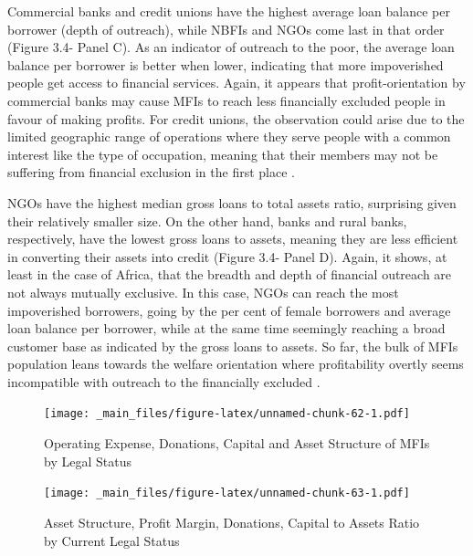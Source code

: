 \documentclass[a4paper, nobind]{templates/ociamthesis}
\begin{document}
Commercial banks and credit unions have the highest average loan balance per borrower (depth of outreach), while NBFIs and NGOs come last in that order (Figure 3.4- Panel C). As an indicator of outreach to the poor, the average loan balance per borrower is better when lower, indicating that more impoverished people get access to financial services. Again, it appears that profit-orientation by commercial banks may cause MFIs to reach less financially excluded people in favour of making profits. For credit unions, the observation could arise due to the limited geographic range of operations where they serve people with a common interest like the type of occupation, meaning that their members may not be suffering from financial exclusion in the first place \autocite{armendariz2013subsidy}.

NGOs have the highest median gross loans to total assets ratio, surprising given their relatively smaller size. On the other hand, banks and rural banks, respectively, have the lowest gross loans to assets, meaning they are less efficient in converting their assets into credit (Figure 3.4- Panel D). Again, it shows, at least in the case of Africa, that the breadth and depth of financial outreach are not always mutually exclusive. In this case, NGOs can reach the most impoverished borrowers, going by the per cent of female borrowers and average loan balance per borrower, while at the same time seemingly reaching a broad customer base as indicated by the gross loans to assets. So far, the bulk of MFIs population leans towards the welfare orientation where profitability overtly seems incompatible with outreach to the financially excluded \autocite{lopatta2016microfinance}.

\newpage
\begin{landscape}

\begin{figure}
\centering
\texttt{[image: \_main\_files/figure-latex/unnamed-chunk-62-1.pdf]}
\caption{\label{fig:unnamed-chunk-62}Operating Expense, Donations, Capital and Asset Structure of MFIs by Legal Status}
\end{figure}

\newpage

\begin{figure}
\centering
\texttt{[image: \_main\_files/figure-latex/unnamed-chunk-63-1.pdf]}
\caption{\label{fig:unnamed-chunk-63}Asset Structure, Profit Margin, Donations, Capital to Assets Ratio by Current Legal Status}
\end{figure}

\end{landscape}
\end{document}
